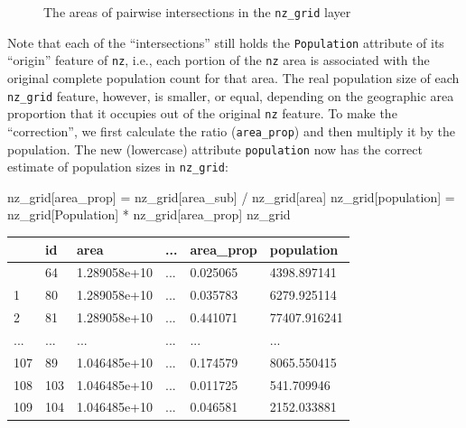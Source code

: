 \documentclass[
  letterpaper,
]{krantz}
\newenvironment{Shaded}{\begin{snugshade}}{\end{snugshade}}
\newcommand{\NormalTok}[1]{\textcolor[rgb]{0.00,0.23,0.31}{#1}}
\newcommand{\OperatorTok}[1]{\textcolor[rgb]{0.37,0.37,0.37}{#1}}
\newcommand{\StringTok}[1]{\textcolor[rgb]{0.13,0.47,0.30}{#1}}
\begin{document}
\begin{figure}[H]


\caption{\label{fig-nz-and-grid2}The areas of pairwise intersections in
the \texttt{nz\_grid} layer}

\end{figure}%

Note that each of the ``intersections'' still holds the
\texttt{Population} attribute of its ``origin'' feature of \texttt{nz},
i.e., each portion of the \texttt{nz} area is associated with the
original complete population count for that area. The real population
size of each \texttt{nz\_grid} feature, however, is smaller, or equal,
depending on the geographic area proportion that it occupies out of the
original \texttt{nz} feature. To make the ``correction'', we first
calculate the ratio (\texttt{area\_prop}) and then multiply it by the
population. The new (lowercase) attribute \texttt{population} now has
the correct estimate of population sizes in \texttt{nz\_grid}:

\begin{Shaded}
\begin{Highlighting}[]
\NormalTok{nz\_grid[}\StringTok{\textquotesingle{}area\_prop\textquotesingle{}}\NormalTok{] }\OperatorTok{=}\NormalTok{ nz\_grid[}\StringTok{\textquotesingle{}area\_sub\textquotesingle{}}\NormalTok{] }\OperatorTok{/}\NormalTok{ nz\_grid[}\StringTok{\textquotesingle{}area\textquotesingle{}}\NormalTok{]}
\NormalTok{nz\_grid[}\StringTok{\textquotesingle{}population\textquotesingle{}}\NormalTok{] }\OperatorTok{=}\NormalTok{ nz\_grid[}\StringTok{\textquotesingle{}Population\textquotesingle{}}\NormalTok{] }\OperatorTok{*}\NormalTok{ nz\_grid[}\StringTok{\textquotesingle{}area\_prop\textquotesingle{}}\NormalTok{]}
\NormalTok{nz\_grid}
\end{Highlighting}
\end{Shaded}

\begin{longtable}[]{@{}llllll@{}}
\toprule\noalign{}
& id & area & ... & area\_prop & population \\
\midrule\noalign{}
\endhead
\bottomrule\noalign{}
\endlastfoot
0 & 64 & 1.289058e+10 & ... & 0.025065 & 4398.897141 \\
1 & 80 & 1.289058e+10 & ... & 0.035783 & 6279.925114 \\
2 & 81 & 1.289058e+10 & ... & 0.441071 & 77407.916241 \\
... & ... & ... & ... & ... & ... \\
107 & 89 & 1.046485e+10 & ... & 0.174579 & 8065.550415 \\
108 & 103 & 1.046485e+10 & ... & 0.011725 & 541.709946 \\
109 & 104 & 1.046485e+10 & ... & 0.046581 & 2152.033881 \\
\end{longtable}
\end{document}
